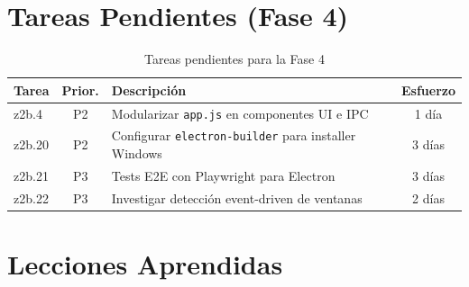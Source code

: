 \documentclass[12pt,a4paper]{article}
\begin{document}
\section{Tareas Pendientes (Fase 4)}

\begin{table}[H]
\centering
\renewcommand{\arraystretch}{1.3}
\begin{tabularx}{\textwidth}{l c X c}
\toprule
\textbf{Tarea} & \textbf{Prior.} & \textbf{Descripci\'on} & \textbf{Esfuerzo} \\
\midrule
z2b.4 & P2 & Modularizar \texttt{app.js} en componentes UI e IPC & 1 d\'ia \\
z2b.20 & P2 & Configurar \texttt{electron-builder} para installer Windows & 3 d\'ias \\
z2b.21 & P3 & Tests E2E con Playwright para Electron & 3 d\'ias \\
z2b.22 & P3 & Investigar detecci\'on event-driven de ventanas & 2 d\'ias \\
\bottomrule
\end{tabularx}
\caption{Tareas pendientes para la Fase 4}
\end{table}

\section{Lecciones Aprendidas}
\end{document}
